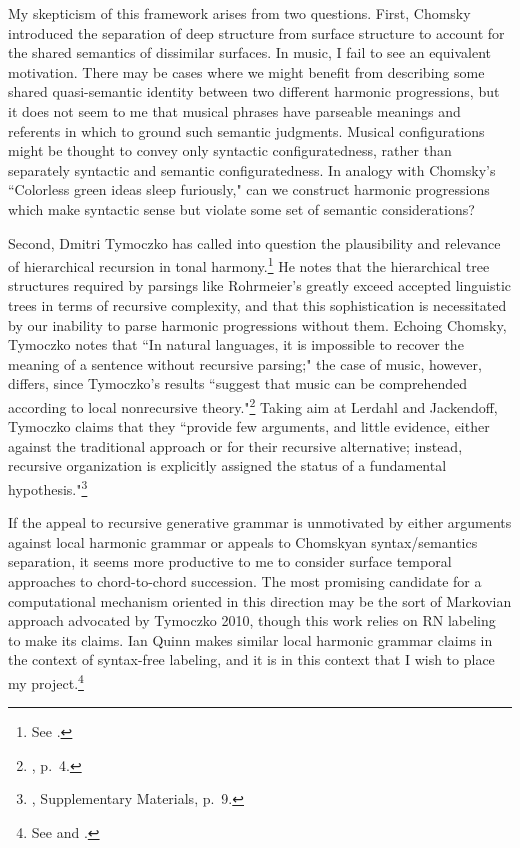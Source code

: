 My skepticism of this framework arises from two questions.  First, Chomsky introduced the separation of deep structure from surface structure to account for the shared semantics of dissimilar surfaces.  In music, I fail to see an equivalent motivation.  There may be cases where we might benefit from describing some shared quasi-semantic identity between two different harmonic progressions, but it does not seem to me that musical phrases have parseable meanings and referents in which to ground such semantic judgments.  Musical configurations might be thought to convey only syntactic configuratedness, rather than separately syntactic and semantic configuratedness.  In analogy with Chomsky's ``Colorless green ideas sleep furiously," can we construct harmonic progressions which make syntactic sense but violate some set of semantic considerations?

Second, Dmitri Tymoczko has called into question the plausibility and relevance of hierarchical recursion in tonal harmony.\footnote{See \cite{tymoczko2010local}.}  He notes that the hierarchical tree structures required by parsings like Rohrmeier's greatly exceed accepted linguistic trees in terms of recursive complexity, and that this sophistication is necessitated by our inability to parse harmonic progressions without them.  Echoing Chomsky, Tymoczko notes that ``In natural languages, it is impossible to recover the meaning of a sentence without recursive parsing;" the case of music, however, differs, since Tymoczko's results ``suggest that music can be comprehended according to local nonrecursive theory."\footnote{\cite{tymoczko2010local}, p.\ 4.}  Taking aim at Lerdahl and Jackendoff, Tymoczko claims that they ``provide few arguments, and little evidence, either against the traditional approach or for their recursive alternative; instead, recursive organization is explicitly assigned the status of a fundamental hypothesis."\footnote{\cite{tymoczko2010local}, Supplementary Materials, p.\ 9.}

If the appeal to recursive generative grammar is unmotivated by either arguments against local harmonic grammar or appeals to Chomskyan syntax/semantics separation, it seems more productive to me to consider surface temporal approaches to chord-to-chord succession.  The most promising candidate for a computational mechanism oriented in this direction may be the sort of Markovian approach advocated by Tymoczko 2010, though this work relies on RN labeling to make its claims.  Ian Quinn makes similar local harmonic grammar claims in the context of syntax-free labeling, and it is in this context that I wish to place my project.\footnote{See \cite{quinn2010} and \cite{quinn2011}.}

